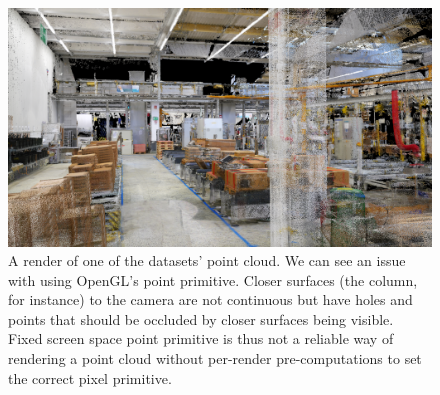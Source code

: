 \begin{figure}
    \centering
    \includegraphics[width=.9\textwidth]{../graphics/0217_pyrender_artwin_render.png}
    \caption[Basic OpenGL point cloud rendering example]{A render of one of the datasets'
    point cloud. We can see an issue with using OpenGL's point
    primitive. Closer surfaces (the column, for instance) to the camera are not continuous but have holes
    and points that should be occluded by closer surfaces being visible. Fixed screen space point
    primitive is thus not a reliable way of rendering a point cloud without per-render pre-computations
    to set the correct pixel primitive.}\label{fig:pyrender_artwin_render}
\end{figure}

